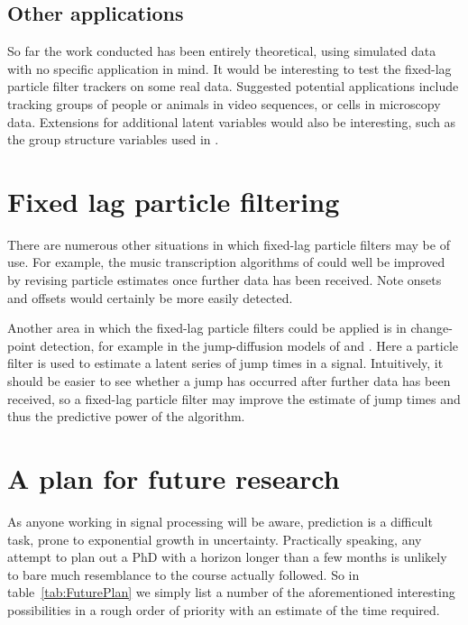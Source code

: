 \subsection{Other applications}
So far the work conducted has been entirely theoretical, using simulated data with no specific application in mind. It would be interesting to test the fixed-lag particle filter trackers on some real data. Suggested potential applications include tracking groups of people or animals in video sequences, or cells in microscopy data. Extensions for additional latent variables would also be interesting, such as the group structure variables used in \cite{Pang2011}.



\section{Fixed lag particle filtering}
There are numerous other situations in which fixed-lag particle filters may be of use. For example, the music transcription algorithms of \cite{Bunch2010} could well be improved by revising particle estimates once further data has been received. Note onsets and offsets would certainly be more easily detected.

Another area in which the fixed-lag particle filters could be applied is in change-point detection, for example in the jump-diffusion models of \cite{Godsill2007a} and \cite{Christensen2012}. Here a particle filter is used to estimate a latent series of jump times in a signal. Intuitively, it should be easier to see whether a jump has occurred after further data has been received, so a fixed-lag particle filter may improve the estimate of jump times and thus the predictive power of the algorithm.



\section{A plan for future research}
As anyone working in signal processing will be aware, prediction is a difficult task, prone to exponential growth in uncertainty. Practically speaking, any attempt to plan out a PhD with a horizon longer than a few months is unlikely to bare much resemblance to the course actually followed. So in table~\ref{tab:FuturePlan} we simply list a number of the aforementioned interesting possibilities in a rough order of priority with an estimate of the time required.

